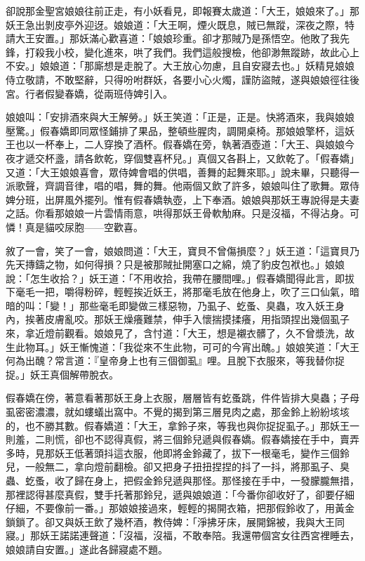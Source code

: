 卻說那金聖宮娘娘往前正走，有小妖看見，即報賽太歲道：「大王，娘娘來了。」那妖王急出剝皮亭外迎迓。娘娘道：「大王啊，煙火既息，賊已無蹤，深夜之際，特請大王安置。」那妖滿心歡喜道：「娘娘珍重。卻才那賊乃是孫悟空。他敗了我先鋒，打殺我小校，變化進來，哄了我們。我們這般搜檢，他卻渺無蹤跡，故此心上不安。」娘娘道：「那廝想是走脫了。大王放心勿慮，且自安寢去也。」妖精見娘娘侍立敬請，不敢堅辭，只得吩咐群妖，各要小心火燭，謹防盜賊，遂與娘娘徑往後宮。行者假變春嬌，從兩班侍婢引入。

娘娘叫：「安排酒來與大王解勞。」妖王笑道：「正是，正是。快將酒來，我與娘娘壓驚。」假春嬌即同眾怪鋪排了果品，整頓些腥肉，調開桌椅。那娘娘擎杯，這妖王也以一杯奉上，二人穿換了酒杯。假春嬌在旁，執著酒壺道：「大王、與娘娘今夜才遞交杯盞，請各飲乾，穿個雙喜杯兒。」真個又各斟上，又飲乾了。「假春嬌」又道：「大王娘娘喜會，眾侍婢會唱的供唱，善舞的起舞來耶。」說未畢，只聽得一派歌聲，齊調音律，唱的唱，舞的舞。他兩個又飲了許多，娘娘叫住了歌舞。眾侍婢分班，出屏風外擺列。惟有假春嬌執壺，上下奉酒。娘娘與那妖王專說得是夫妻之話。你看那娘娘一片雲情雨意，哄得那妖王骨軟觔麻。只是沒福，不得沾身。可憐！真是貓咬尿胞——空歡喜。

敘了一會，笑了一會，娘娘問道：「大王，寶貝不曾傷損麼？」妖王道：「這寶貝乃先天摶鑄之物，如何得損？只是被那賊扯開塞口之綿，燒了豹皮包袱也。」娘娘說：「怎生收拾？」妖王道：「不用收拾，我帶在腰間哩。」假春嬌聞得此言，即拔下毫毛一把，嚼得粉碎，輕輕挨近妖王，將那毫毛放在他身上，吹了三口仙氣，暗暗的叫：「變！」那些毫毛即變做三樣惡物，乃虱子、虼蚤、臭蟲，攻入妖王身內，挨著皮膚亂咬。那妖王燥癢難禁，伸手入懷揣摸揉癢，用指頭捏出幾個虱子來，拿近燈前觀看。娘娘見了，含忖道：「大王，想是襯衣髒了，久不曾漿洗，故生此物耳。」妖王慚愧道：「我從來不生此物，可可的今宵出醜。」娘娘笑道：「大王何為出醜？常言道：『皇帝身上也有三個御虱』哩。且脫下衣服來，等我替你捉捉。」妖王真個解帶脫衣。

假春嬌在傍，著意看著那妖王身上衣服，層層皆有虼蚤跳，件件皆排大臭蟲；子母虱密密濃濃，就如螻蟻出窩中。不覺的揭到第三層見肉之處，那金鈴上紛紛垓垓的，也不勝其數。假春嬌道：「大王，拿鈴子來，等我也與你捉捉虱子。」那妖王一則羞，二則慌，卻也不認得真假，將三個鈴兒遞與假春嬌。假春嬌接在手中，賣弄多時，見那妖王低著頭抖這衣服，他即將金鈴藏了，拔下一根毫毛，變作三個鈴兒，一般無二，拿向燈前翻檢。卻又把身子扭扭捏捏的抖了一抖，將那虱子、臭蟲、虼蚤，收了歸在身上，把假金鈴兒遞與那怪。那怪接在手中，一發朦朧無措，那裡認得甚麼真假，雙手托著那鈴兒，遞與娘娘道：「今番你卻收好了，卻要仔細仔細，不要像前一番。」那娘娘接過來，輕輕的揭開衣箱，把那假鈴收了，用黃金鎖鎖了。卻又與妖王飲了幾杯酒，教侍婢：「淨拂牙床，展開錦被，我與大王同寢。」那妖王諾諾連聲道：「沒福，沒福，不敢奉陪。我還帶個宮女往西宮裡睡去，娘娘請自安置。」遂此各歸寢處不題。

